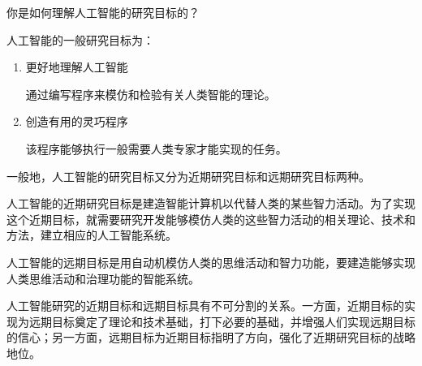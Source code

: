 \begin{question}
你是如何理解人工智能的研究目标的？
\end{question}
\begin{solution}
人工智能的一般研究目标为：
	\begin{enumerate}
		\item 更好地理解人工智能 \par
		通过编写程序来模仿和检验有关人类智能的理论。
		\item 创造有用的灵巧程序 \par 
		该程序能够执行一般需要人类专家才能实现的任务。
	\end{enumerate} \par 
	一般地，人工智能的研究目标又分为近期研究目标和远期研究目标两种。\par
	人工智能的近期研究目标是建造智能计算机以代替人类的某些智力活动。为了实现这个近期目标，就需要研究开发能够模仿人类的这些智力活动的相关理论、技术和方法，建立相应的人工智能系统。\par
	人工智能的远期目标是用自动机模仿人类的思维活动和智力功能，要建造能够实现人类思维活动和治理功能的智能系统。\par
	人工智能研究的近期目标和远期目标具有不可分割的关系。一方面，近期目标的实现为远期目标奠定了理论和技术基础，打下必要的基础，并增强人们实现远期目标的信心；另一方面，远期目标为近期目标指明了方向，强化了近期研究目标的战略地位。
\end{solution}

